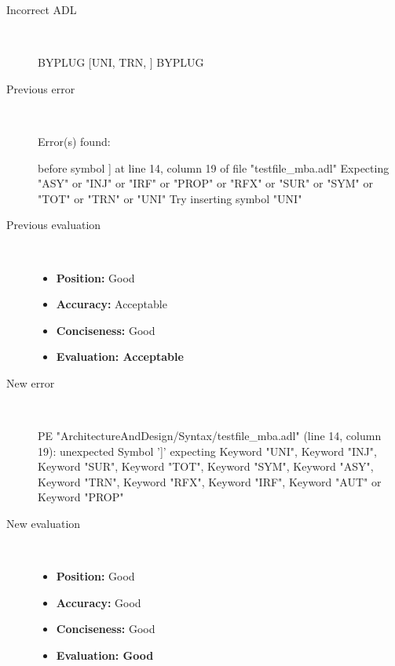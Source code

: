 \begin{description}
  \item[Incorrect ADL]~\\
\begin{adl}
BYPLUG [UNI, TRN, ] BYPLUG\end{adl}
  \item[Previous error]~\\
\begin{haskell}
Error(s) found:

before symbol ] at line 14, column 19 of file "testfile_mba.adl"
Expecting "ASY" or "INJ" or "IRF" or "PROP" or "RFX" or "SUR" or "SYM" or "TOT"
or "TRN" or "UNI"
Try inserting symbol "UNI"
\end{haskell}
  \item[Previous evaluation]~\\
    \begin{itemize}
    \item \textbf{Position:} Good
    \item \textbf{Accuracy:} Acceptable
    \item \textbf{Conciseness:} Good
    \item \textbf{Evaluation: Acceptable}
    \end{itemize}
  \item[New error]~\\
\begin{haskell}
PE "ArchitectureAndDesign/Syntax/testfile_mba.adl" (line 14, column 19):
unexpected Symbol ']'
expecting Keyword "UNI", Keyword "INJ", Keyword "SUR", Keyword "TOT", Keyword "SYM", Keyword "ASY", Keyword "TRN", Keyword "RFX", Keyword "IRF", Keyword "AUT" or Keyword "PROP"
\end{haskell}
  \item[New evaluation]~\\
    \begin{itemize}
    \item \textbf{Position:} Good
    \item \textbf{Accuracy:} Good
    \item \textbf{Conciseness:} Good
    \item \textbf{Evaluation: Good}
    \end{itemize}
  \end{description}

\hrulefill

